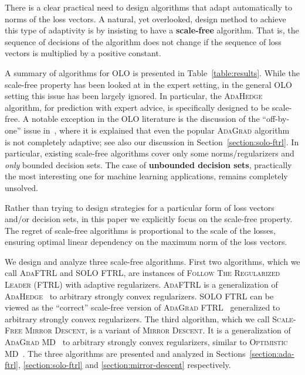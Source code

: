 
There is a clear practical need to design algorithms that adapt automatically
to norms of the loss vectors.  A natural, yet overlooked, design method to
achieve this type of adaptivity is by insisting to have a \textbf{scale-free}
algorithm.  That is, the sequence of decisions of the algorithm does not change
if the sequence of loss vectors is multiplied by a positive constant.

A summary of algorithms for OLO is presented in Table~\ref{table:results}.
While the scale-free property has been looked at in the expert setting, in the
general OLO setting this issue has been largely ignored.  In particular, the
\textsc{AdaHedge}~\cite{de-Rooij-van-Erven-Grunwald-Koolen-2014} algorithm, for
prediction with expert advice, is specifically designed to be scale-free.  A
notable exception in the OLO literature is the discussion of the ``off-by-one''
issue in~\cite{McMahan-2014}, where it is explained that even the popular
\textsc{AdaGrad} algorithm~\cite{Duchi-Hazan-Singer-2011} is not completely
adaptive; see also our discussion in Section~\ref{section:solo-ftrl}. In
particular, existing scale-free algorithms cover only some norms/regularizers
and \emph{only} bounded decision sets. The case of \textbf{unbounded decision
sets}, practically the most interesting one for machine learning applications,
remains completely unsolved.

Rather than trying to design strategies for a particular form of loss vectors
and/or decision sets, in this paper we explicitly focus on the scale-free
property. The regret of scale-free algorithms is proportional to the scale of the
losses, ensuring optimal linear dependency on the maximum norm of the loss
vectors.

We design and analyze three scale-free algorithms. First two algorithms, which
we call \textsc{AdaFTRL} and \textsc{SOLO FTRL}, are instances of
\textsc{Follow The Regularized Leader} (\textsc{FTRL}) with adaptive regularizers.
\textsc{AdaFTRL} is a generalization of
\textsc{AdaHedge}~\cite{de-Rooij-van-Erven-Grunwald-Koolen-2014} to arbitrary
strongly convex regularizers.  \textsc{SOLO FTRL} can be viewed as the
``correct'' scale-free version of \textsc{AdaGrad
FTRL}~\cite{Duchi-Hazan-Singer-2011} generalized to arbitrary strongly convex
regularizers.  The third algorithm, which we call \textsc{Scale-Free Mirror
Descent}, is a variant of \textsc{Mirror Descent}. It is a generalization of
\textsc{AdaGrad MD}~\cite{Duchi-Hazan-Singer-2011} to arbitrary strongly convex
regularizers, similar to \textsc{Optimistic MD}~\cite{Rakhlin-Sridharan-2013}.
The three algorithms are presented and analyzed in
Sections~\ref{section:ada-ftrl}, \ref{section:solo-ftrl} and
\ref{section:mirror-descent} respectively.

